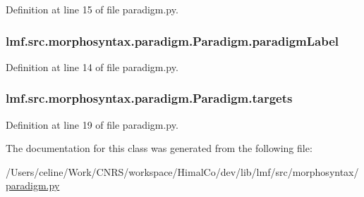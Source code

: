 Definition at line 15 of file paradigm.\+py.

\hypertarget{classlmf_1_1src_1_1morphosyntax_1_1paradigm_1_1_paradigm_a5892a515d2311d4c03b180603a0d2929}{
\subsubsection[{paradigm\+Label}]{\setlength{\rightskip}{0pt plus 5cm}lmf.\+src.\+morphosyntax.\+paradigm.\+Paradigm.\+paradigm\+Label}}\label{classlmf_1_1src_1_1morphosyntax_1_1paradigm_1_1_paradigm_a5892a515d2311d4c03b180603a0d2929}


Definition at line 14 of file paradigm.\+py.

\hypertarget{classlmf_1_1src_1_1morphosyntax_1_1paradigm_1_1_paradigm_a546af1d9fc21b3b1a6d102e39877a587}{
\subsubsection[{targets}]{\setlength{\rightskip}{0pt plus 5cm}lmf.\+src.\+morphosyntax.\+paradigm.\+Paradigm.\+targets}}\label{classlmf_1_1src_1_1morphosyntax_1_1paradigm_1_1_paradigm_a546af1d9fc21b3b1a6d102e39877a587}


Definition at line 19 of file paradigm.\+py.



The documentation for this class was generated from the following file\+:\begin{DoxyCompactItemize}
\item 
/\+Users/celine/\+Work/\+C\+N\+R\+S/workspace/\+Himal\+Co/dev/lib/lmf/src/morphosyntax/\hyperlink{paradigm_8py}{paradigm.\+py}\end{DoxyCompactItemize}
